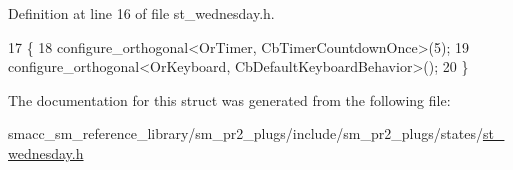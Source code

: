 Definition at line 16 of file st\+\_\+wednesday.\+h.


\begin{DoxyCode}
17     \{
18         configure\_orthogonal<OrTimer,  CbTimerCountdownOnce>(5);    
19         configure\_orthogonal<OrKeyboard, CbDefaultKeyboardBehavior>();
20     \}
\end{DoxyCode}


The documentation for this struct was generated from the following file\+:\begin{DoxyCompactItemize}
\item 
smacc\+\_\+sm\+\_\+reference\+\_\+library/sm\+\_\+pr2\+\_\+plugs/include/sm\+\_\+pr2\+\_\+plugs/states/\hyperlink{sm__pr2__plugs_2include_2sm__pr2__plugs_2states_2st__wednesday_8h}{st\+\_\+wednesday.\+h}\end{DoxyCompactItemize}
